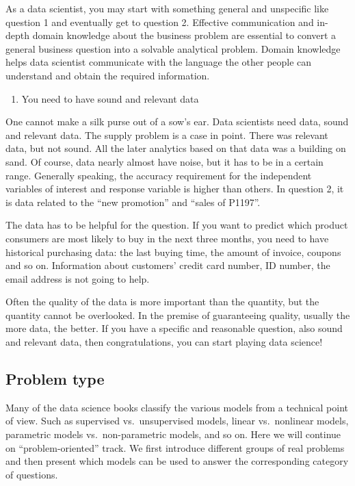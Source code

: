 \documentclass[12pt,]{krantz}
\providecommand{\tightlist}{%
  \setlength{\itemsep}{0pt}\setlength{\parskip}{0pt}}
\theoremstyle{definition}
\theoremstyle{definition}
\theoremstyle{definition}
\theoremstyle{remark}
\begin{document}
As a data scientist, you may start with something general and unspecific
like question 1 and eventually get to question 2. Effective
communication and in-depth domain knowledge about the business problem
are essential to convert a general business question into a solvable
analytical problem. Domain knowledge helps data scientist communicate
with the language the other people can understand and obtain the
required information.

\begin{enumerate}
\def\labelenumi{\arabic{enumi}.}
\setcounter{enumi}{1}
\tightlist
\item
  You need to have sound and relevant data
\end{enumerate}

One cannot make a silk purse out of a sow's ear. Data scientists need
data, sound and relevant data. The supply problem is a case in point.
There was relevant data, but not sound. All the later analytics based on
that data was a building on sand. Of course, data nearly almost have
noise, but it has to be in a certain range. Generally speaking, the
accuracy requirement for the independent variables of interest and
response variable is higher than others. In question 2, it is data
related to the ``new promotion'' and ``sales of P1197''.

The data has to be helpful for the question. If you want to predict
which product consumers are most likely to buy in the next three months,
you need to have historical purchasing data: the last buying time, the
amount of invoice, coupons and so on. Information about customers'
credit card number, ID number, the email address is not going to help.

Often the quality of the data is more important than the quantity, but
the quantity cannot be overlooked. In the premise of guaranteeing
quality, usually the more data, the better. If you have a specific and
reasonable question, also sound and relevant data, then congratulations,
you can start playing data science!

\subsection{Problem type}\label{problem-type}

Many of the data science books classify the various models from a
technical point of view. Such as supervised vs.~unsupervised models,
linear vs.~nonlinear models, parametric models vs.~non-parametric
models, and so on. Here we will continue on ``problem-oriented'' track.
We first introduce different groups of real problems and then present
which models can be used to answer the corresponding category of
questions.
\end{document}
